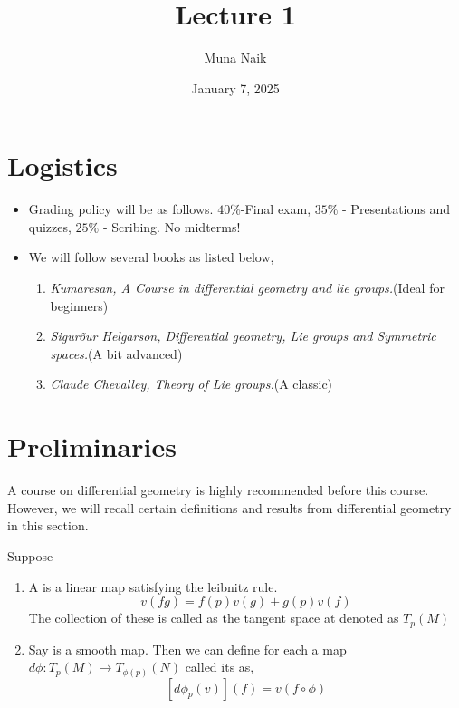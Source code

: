 \documentclass{article}
\title{Lecture 1}
\date{January 7, 2025}
\author{Muna Naik}
\begin{document}
\maketitle

\section*{Logistics}

\begin{itemize}
    \item Grading policy will be as follows. $40\%$-Final exam, $35\%$ - Presentations and quizzes, $25\%$ - Scribing. No midterms!
    \item We will follow several books as listed below,
    \begin{enumerate}
        \item \textit{Kumaresan, A Course in differential geometry and lie groups.}(Ideal for beginners)
        \item \textit{Sigurõur Helgarson, Differential geometry, Lie groups and Symmetric spaces.}(A bit advanced)
        \item \textit{Claude Chevalley, Theory of Lie groups.}(A classic)
    \end{enumerate} 
\end{itemize}

\section{Preliminaries}

A course on differential geometry is highly recommended before this course. However, we will recall certain definitions and results from differential geometry 
in this section. 

\begin{definition}
    Suppose 
    \begin{enumerate}
        \item A  is a linear map  satisfying the leibnitz rule.
        $$v(fg) = f(p)v(g)+g(p)v(f)$$
        The collection of these is called as the tangent space at  denoted as $T_p(M)$
        \item Say  is a smooth map. Then we can define for each  a map $d\phi:T_p(M)\to T_{\phi(p)}(N)$
        called its  as,
        $$[d\phi_p(v)](f) = v(f\circ \phi)$$
    \end{enumerate}
\end{definition}
\end{document}
